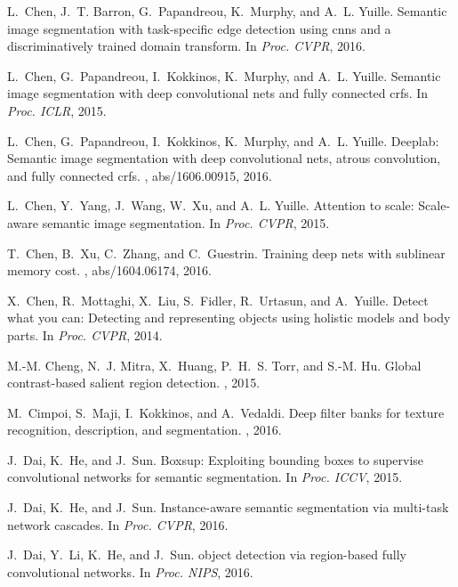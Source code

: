 \documentclass[10pt,twocolumn,letterpaper]{article}
\begin{document}
\begin{thebibliography}{100}
	L.~Chen, J.~T. Barron, G.~Papandreou, K.~Murphy, and A.~L. Yuille.
	\newblock Semantic image segmentation with task-specific edge detection using
	cnns and a discriminatively trained domain transform.
	\newblock In {\em Proc. {CVPR}}, 2016.
	
	L.~Chen, G.~Papandreou, I.~Kokkinos, K.~Murphy, and A.~L. Yuille.
	\newblock Semantic image segmentation with deep convolutional nets and fully
	connected crfs.
	\newblock In {\em Proc. {ICLR}}, 2015.
	
	L.~Chen, G.~Papandreou, I.~Kokkinos, K.~Murphy, and A.~L. Yuille.
	\newblock Deeplab: Semantic image segmentation with deep convolutional nets,
	atrous convolution, and fully connected crfs.
	, abs/1606.00915, 2016.
	
	L.~Chen, Y.~Yang, J.~Wang, W.~Xu, and A.~L. Yuille.
	\newblock Attention to scale: Scale-aware semantic image segmentation.
	\newblock In {\em Proc. {CVPR}}, 2015.
	
	T.~Chen, B.~Xu, C.~Zhang, and C.~Guestrin.
	\newblock Training deep nets with sublinear memory cost.
	, abs/1604.06174, 2016.
	
	X.~Chen, R.~Mottaghi, X.~Liu, S.~Fidler, R.~Urtasun, and A.~Yuille.
	\newblock Detect what you can: Detecting and representing objects using
	holistic models and body parts.
	\newblock In {\em Proc. {CVPR}}, 2014.
	
	M.-M. Cheng, N.~J. Mitra, X.~Huang, P.~H.~S. Torr, and S.-M. Hu.
	\newblock Global contrast-based salient region detection.
	, 2015.
	
	M.~Cimpoi, S.~Maji, I.~Kokkinos, and A.~Vedaldi.
	\newblock Deep filter banks for texture recognition, description, and
	segmentation.
	, 2016.
	
	J.~Dai, K.~He, and J.~Sun.
	\newblock Boxsup: Exploiting bounding boxes to supervise convolutional networks
	for semantic segmentation.
	\newblock In {\em Proc. {ICCV}}, 2015.
	
	J.~Dai, K.~He, and J.~Sun.
	\newblock Instance-aware semantic segmentation via multi-task network cascades.
	\newblock In {\em Proc. {CVPR}}, 2016.
	
	J.~Dai, Y.~Li, K.~He, and J.~Sun.
	 object detection via region-based fully convolutional
	networks.
	\newblock In {\em Proc. {NIPS}}, 2016.
	

\end{thebibliography}
\end{document}

